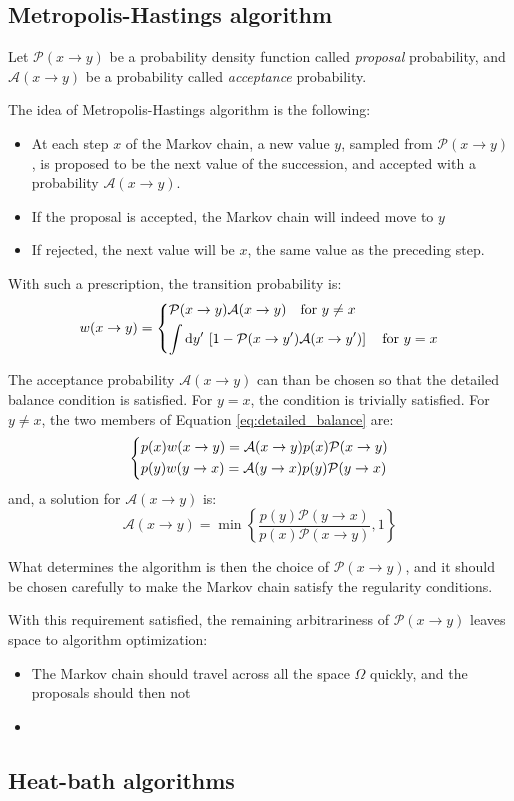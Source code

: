 \subsection*{Metropolis-Hastings algorithm}
Let $\mathcal P(x\to y)$ be a probability density function called \emph{proposal} probability,
and $\mathcal A(x\to y)$ be a probability called \emph{acceptance} probability.

The idea of Metropolis-Hastings algorithm is the following:
\begin{itemize}
    \item At each step $x$ of the Markov chain, a new value $y$, sampled from $\mathcal P(x\to y)$,
        is proposed to be the next value of the succession, and accepted with a probability $\mathcal A(x\to y)$.
    \item If the proposal is accepted, the Markov chain will indeed move to $y$
    \item If rejected, the next value will be $x$, \ie the same value as the preceding step.
\end{itemize}

With such a prescription, the transition probability is:
\[
    w(x\to y) = 
    \begin{dcases}
        \mathcal P(x\to y)\mathcal A(x\to y) \quad \mathrm{for}\ y \neq x \\
        \int\mathrm dy'\,\left[1 - \mathcal P(x\to y')\mathcal A(x\to y')\right] \quad \mathrm{for}\ y=x
    \end{dcases}
\]

The acceptance probability $\mathcal A(x\to y)$ can than be chosen so that the detailed balance condition is satisfied.
For $y=x$, the condition is trivially satisfied. 
For $y\neq x$, the two members of Equation \eqref{eq:detailed_balance} are:
\[
    \begin{dcases}
        p(x)w(x\to y) = \mathcal A(x\to y)p(x)\mathcal P(x\to y) \\
        p(y)w(y\to x) = \mathcal A(y\to x)p(y)\mathcal P(y\to x)
    \end{dcases}
\]
and, a solution for $\mathcal A(x\to y)$ is:
\[
    \mathcal A(x\to y) = \min\left\{\frac{p(y)\mathcal P(y\to x)}{p(x)\mathcal P(x\to y)},1\right\}
\]

What determines the algorithm is then the choice of $\mathcal P(x\to y)$,
and it should be chosen carefully to make the Markov chain satisfy the regularity conditions.

With this requirement satisfied, the remaining arbitrariness of $\mathcal P(x\to y)$ leaves space to algorithm optimization:
\begin{itemize}
    \item The Markov chain should travel across all the space $\Omega$ quickly, and the proposals should then not 
    \item
\end{itemize}

\subsection*{Heat-bath algorithms}

